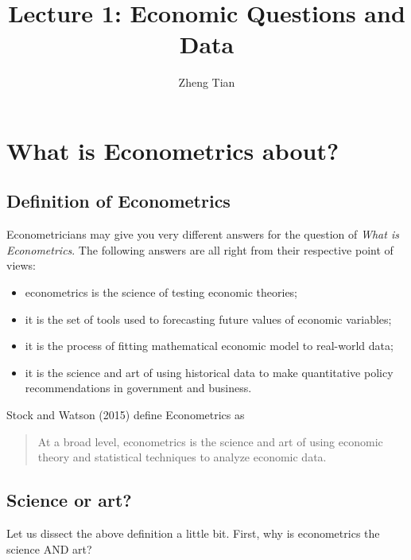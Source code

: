 \documentclass[a4paper,11pt]{article}
\author{Zheng Tian}
\date{}
\title{Lecture 1: Economic Questions and Data}
\begin{document}
\maketitle
\setcounter{tocdepth}{1}
\tableofcontents


\section{What is Econometrics about?}
\label{sec:orgaf97795}

\subsection{Definition of Econometrics}
\label{sec:org1f44975}

Econometricians may give you very different answers for the question
of \emph{What is Econometrics}. The following answers are all right from
their respective point of views:
\begin{itemize}
\item econometrics is the science of testing economic theories;
\item it is the set of tools used to forecasting future values
of economic variables;
\item it is the process of fitting mathematical economic model
to real-world data;
\item it is the science and art of using historical data to make
quantitative policy recommendations in government and business.
\end{itemize}

Stock and Watson (2015) define Econometrics as
\begin{quote}
At a broad level, econometrics is the science and art of using
economic theory and statistical techniques to analyze economic
data.
\end{quote}



\subsection{Science or art?}
\label{sec:org625cba7}

Let us dissect the above definition a little bit. First, why is
econometrics the science AND art?
\end{document}
